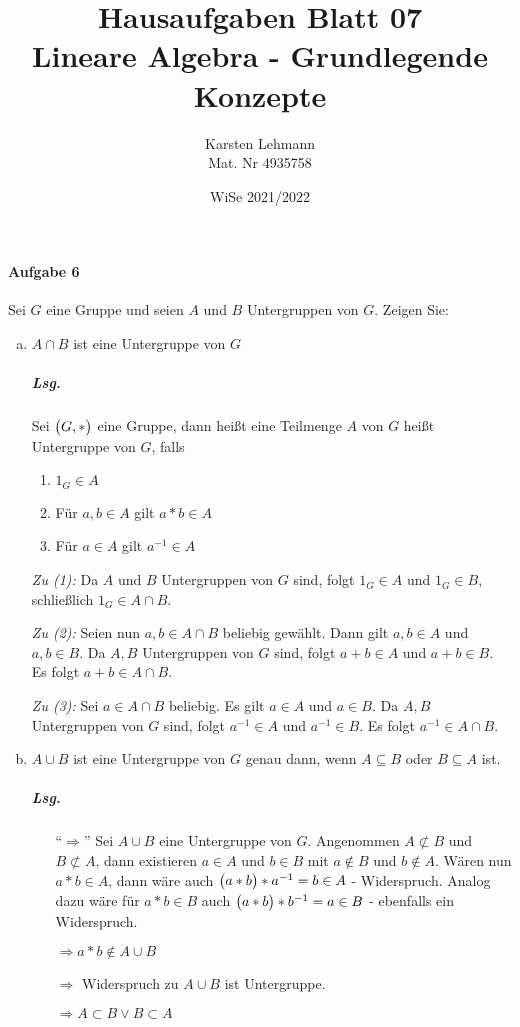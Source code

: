 \documentclass{scrreprt}
\author{Karsten Lehmann\\Mat. Nr 4935758}
\date{WiSe 2021/2022}
\title{Hausaufgaben Blatt 07\\Lineare Algebra - Grundlegende Konzepte}
\begin{document}
\paragraph{Aufgabe 6}
Sei $G$ eine Gruppe und seien $A$ und $B$ Untergruppen von $G$.
Zeigen Sie:
\begin{enumerate}[(a)]
\item $A \cap B$ ist eine Untergruppe von $G$

  \subparagraph{Lsg.} Sei $\qty\big(G, *)$ eine Gruppe, dann heißt eine
  Teilmenge $A$ von $G$ heißt Untergruppe von $G$, falls
  \begin{enumerate}[(1)]
  \item $1_G \in A$
  \item Für $a, b \in A$ gilt $a * b \in A$
  \item Für $a \in A$ gilt $a^{-1} \in A$
  \end{enumerate}

  \emph{Zu (1):} Da $A$ und $B$ Untergruppen von $G$ sind, folgt $1_G \in A$ und
  $1_G \in B$, schließlich $1_G \in A \cap B$.

  \emph{Zu (2):} Seien nun $a, b \in A \cap B$ beliebig gewählt.
  Dann gilt $a, b \in A$ und $a, b \in B$.
  Da $A, B$ Untergruppen von $G$ sind, folgt $a + b \in A$ und $a + b \in B$.
  Es folgt $a + b \in A \cap B$.

  \emph{Zu (3):} Sei $a \in A \cap B$ beliebig.
  Es gilt $a \in A$ und $a \in B$.
  Da $A, B$ Untergruppen von $G$ sind, folgt $a^{-1} \in A$ und $a^{-1} \in B$.
  Es folgt $a^{-1} \in A \cap B$.

\item $A \cup B$ ist eine Untergruppe von $G$ genau dann, wenn
  $A \subseteq B$ oder $B \subseteq A$ ist.

  \subparagraph{Lsg.}
  \begin{itemize}
  \item[``$\Rightarrow$''] Sei $A \cup B$ eine Untergruppe von $G$.
    Angenommen $A \not\subset B$ und $B \not\subset A$, dann existieren
    $a \in A$ und $b \in B$ mit $a \notin B$ und $b \notin A$.
    Wären nun $a * b \in A$, dann wäre auch $\qty\big(a * b) * a^{-1} = b \in A$
    - Widerspruch.
    Analog dazu wäre für $a * b \in B$ auch $\qty\big(a * b) * b^{-1} = a \in B$
    - ebenfalls ein Widerspruch.

    $\Rightarrow a * b \not \in A \cup B$

    $\Rightarrow$ Widerspruch zu $A \cup B$ ist Untergruppe.

    $\Rightarrow A \subset B \lor B \subset A$


\end{itemize}
\end{enumerate}
\end{document}
